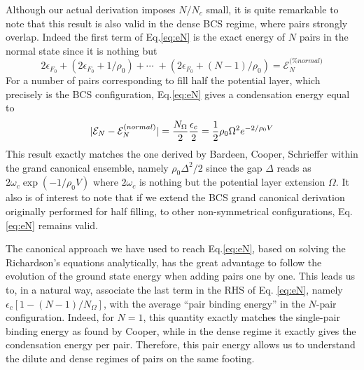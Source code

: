 \documentclass[aps,prb,superscriptaddress,twocolumn]{revtex4}
\begin{document}
Although our actual derivation imposes $N/N_{c}$ small, it is quite
remarkable to note that this result is also valid in the dense BCS regime,
where pairs strongly overlap. Indeed the first term of Eq.\eqref{eq:eN} is
the exact energy of $N$ pairs in the normal state since it is nothing but 
\begin{equation}
2\epsilon _{F_{0}}+\left( 2\epsilon _{F_{0}}+1/\rho _{0}\right) +\cdots
\;+\left( 2\epsilon _{F_{0}}+(N-1)/\rho _{0}\right) =\mathcal{E}_{N}^{\text{(%
}normal)}
\end{equation}%
For a number of pairs corresponding to fill half the potential layer, which precisely is 
the BCS configuration, Eq.\eqref{eq:eN} gives a condensation
energy equal to 
\begin{equation}
|\mathcal{E}_{N}-\mathcal{E}_{N}^{\text{(}normal)}|=\frac{N_{\Omega }}{2}\frac{%
\epsilon _{c}}{2}=\frac{1}{2}\rho _{0}\Omega ^{2}e^{-2/\rho _{0}V}
\end{equation}%
This result exactly matches the one derived by Bardeen, Cooper, Schrieffer within the grand canonical
ensemble, namely $\rho _{0}\Delta ^{2}/2$ since the gap $\Delta $ reads as $%
2\omega _{c}\exp \left( -1/\rho _{0}V\right) $ where $2\omega _{c}$ is nothing but the
potential layer extension $\Omega $. It also is of interest to 
note that if we extend the BCS grand canonical derivation originally performed for half filling, to other
non-symmetrical configurations, Eq.\eqref{eq:eN} remains valid.

The canonical approach we have used to reach Eq.\eqref{eq:eN}, based on solving the
Richardson's equations analytically, has the great advantage to follow the evolution of the
ground state energy when adding pairs one by one. This leads us to, in a natural way, 
associate the last term in the RHS of Eq.%
\eqref{eq:eN}, namely $\epsilon _{c}\left[ 1-\left( N-1\right) /N_{\Omega }%
\right] $, with the average ``pair binding energy'' in the $N$-pair configuration. 
Indeed, for $N=1$, this quantity exactly matches the
single-pair binding energy as found by Cooper, while in the dense regime it exactly
gives the condensation energy per pair. Therefore, this pair energy
allows us to understand the dilute and dense regimes of pairs on the same footing.
\end{document}
